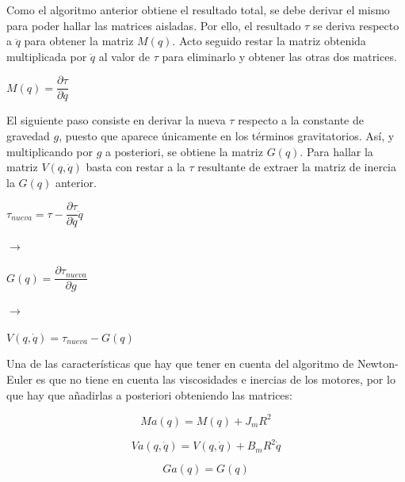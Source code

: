 Como el algoritmo anterior obtiene el resultado total, se debe derivar el mismo para poder hallar las matrices aisladas. Por ello, el resultado $\tau$ se deriva respecto a $\ddot{q}$ para obtener la matriz $M(q)$. Acto seguido restar la matriz obtenida multiplicada por $\ddot{q}$ al valor de $\tau$ para eliminarlo y obtener las otras dos matrices.\\

\begin{center}
	
	$M(q)=\dfrac{\partial{\tau}}{\partial{\ddot{q}}}$
	
\end{center}



El siguiente paso consiste en derivar la nueva $\tau$ respecto a la constante de gravedad $g$, puesto que aparece únicamente en los términos gravitatorios. Así, y multiplicando por $g$ a posteriori, se obtiene la matriz $G(q)$. Para hallar la matriz $V(q,\dot{q})$ basta con restar a la $\tau$ resultante de extraer la matriz de inercia la $G(q)$ anterior.\\

\begin{center}
	
	$\tau_{nueva}=\tau-\dfrac{\partial{\tau}}{\partial{\ddot{q}}}\ddot{q}$
	
	$\rightarrow$
	
	$G(q)=\dfrac{\partial{\tau_{nueva}}}{\partial{g}}$
	
	$\rightarrow$
	
	$V(q,\dot{q})=\tau_{nueva}-G(q)$
	
\end{center}



Una de las características que hay que tener en cuenta del algoritmo de Newton-Euler es que no tiene en cuenta las viscosidades e inercias de los motores, por lo que hay que añadirlas a posteriori obteniendo las matrices:

\begin{equation}
Ma(q)=M(q)+J_mR^2
\end{equation}



\begin{equation}
Va(q,\dot{q})=V(q,\dot{q})+B_mR^2\dot{q}
\end{equation}



\begin{equation}
  Ga(q)=G(q)
\end{equation}

